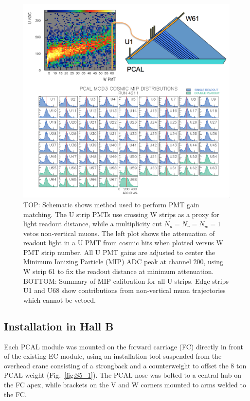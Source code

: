 \begin{figure}[hbt]
\centering
\includegraphics[width=0.95\columnwidth,keepaspectratio]{img/S5_4.png}
\caption{TOP: Schematic shows method used to perform PMT gain matching.  The U strip PMTs use crossing W strips as a proxy for light readout distance, while a multiplicity cut $N_u=N_v=N_w=1$ vetos non-vertical muons.   The left plot shows the attenuation of readout light in a U PMT from cosmic hits when plotted versus W PMT strip number.  All U PMT gains are adjusted to center the Minimum Ionizing Particle (MIP) ADC peak at channel 200, using W strip 61 to fix the readout distance at minimum attenuation.  BOTTOM: Summary of MIP calibration for all U strips.  Edge strips U1 and U68 show contributions from non-vertical muon trajectories which cannot be vetoed.}
\label{fig:S5_4}
\end{figure}

\subsection{Installation in Hall B}
Each PCAL module was mounted on the forward carriage (FC) directly in front of the existing EC module, using an installation tool suspended from the overhead crane consisting of a strongback and a counterweight to offset the 8 ton PCAL weight (Fig.~\ref{fig:S5_1}).  The PCAL nose was bolted to a central hub on the FC apex, while brackets on the V and W corners mounted to arms welded to the FC.   

